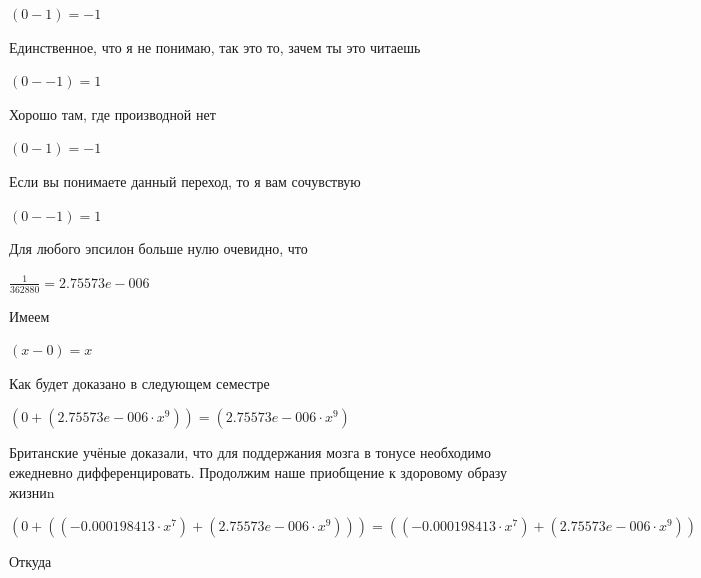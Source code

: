 \documentclass[12pt,a4paper,fleqn]{article}
\begin{document}
\begin{center}
\begin{center}
\begin{center}
\begin{center}
\begin{center}
\begin{center}
\begin{center}
\begin{center}
\begin{center}
\begin{center}
\begin{center}
\begin{center}
\begin{center}
\begin{center}
\begin{center}
\begin{center}
\begin{center}
\begin{center}
\begin{center}
\begin{center}
\begin{center}
\begin{center}
\begin{center}
\begin{center}
\begin{center}
\begin{center}
\begin{center}
\begin{center}
\begin{center}
\begin{center}
\begin{center}
\begin{center}
\begin{center}
\begin{center}
\begin{center}
\begin{center}$(0-1) = -1$\end{center}
Единственное, что я не понимаю, так это то, зачем ты это читаешь

\begin{center}
\begin{center}$(0--1) = 1$\end{center}
Хорошо там, где производной нет\cite{link2}

\begin{center}
\begin{center}$(0-1) = -1$\end{center}
Если вы понимаете данный переход, то я вам сочувствую

\begin{center}
\begin{center}$(0--1) = 1$\end{center}
Для любого эпсилон больше нулю очевидно, что

\begin{center}
\begin{center}$\frac{1}{362880} = 2.75573e-006$\end{center}
Имеем

\begin{center}
$(x-0) = x$\end{center}
Как будет доказано в следующем семестре

\begin{center}
$(0+(2.75573e-006 \cdot x^{9})) = (2.75573e-006 \cdot x^{9})$\end{center}
Британские учёные доказали, что для поддержания мозга в тонусе необходимо ежедневно дифференцировать. Продолжим наше приобщение к здоровому образу жизниn

\begin{center}
$(0+((-0.000198413 \cdot x^{7})+(2.75573e-006 \cdot x^{9}))) = ((-0.000198413 \cdot x^{7})+(2.75573e-006 \cdot x^{9}))$\end{center}
Откуда


\end{center}
\end{center}
\end{center}
\end{center}
\end{center}
\end{center}
\end{center}
\end{center}
\end{center}
\end{center}
\end{center}
\end{center}
\end{center}
\end{center}
\end{center}
\end{center}
\end{center}
\end{center}
\end{center}
\end{center}
\end{center}
\end{center}
\end{center}
\end{center}
\end{center}
\end{center}
\end{center}
\end{center}
\end{center}
\end{center}
\end{center}
\end{center}
\end{center}
\end{center}
\end{center}
\end{center}
\end{center}
\end{center}
\end{center}
\end{document}
